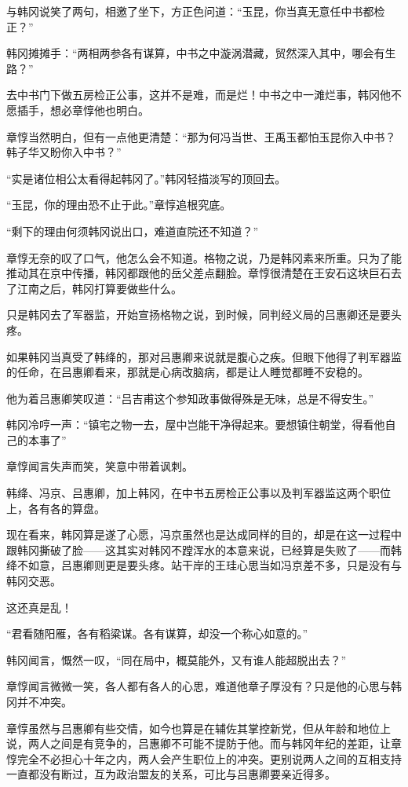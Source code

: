 与韩冈说笑了两句，相邀了坐下，方正色问道：“玉昆，你当真无意任中书都检正？”

韩冈摊摊手：“两相两参各有谋算，中书之中漩涡潜藏，贸然深入其中，哪会有生路？”

去中书门下做五房检正公事，这并不是难，而是烂！中书之中一滩烂事，韩冈他不愿插手，想必章惇他也明白。

章惇当然明白，但有一点他更清楚：“那为何冯当世、王禹玉都怕玉昆你入中书？韩子华又盼你入中书？”

“实是诸位相公太看得起韩冈了。”韩冈轻描淡写的顶回去。

“玉昆，你的理由恐不止于此。”章惇追根究底。

“剩下的理由何须韩冈说出口，难道直院还不知道？”

章惇无奈的叹了口气，他怎么会不知道。格物之说，乃是韩冈素来所重。只为了能推动其在京中传播，韩冈都跟他的岳父差点翻脸。章惇很清楚在王安石这块巨石去了江南之后，韩冈打算要做些什么。

只是韩冈去了军器监，开始宣扬格物之说，到时候，同判经义局的吕惠卿还是要头疼。

如果韩冈当真受了韩绛的，那对吕惠卿来说就是腹心之疾。但眼下他得了判军器监的任命，在吕惠卿看来，那就是心病改脑病，都是让人睡觉都睡不安稳的。

他为着吕惠卿笑叹道：“吕吉甫这个参知政事做得殊是无味，总是不得安生。”

韩冈冷哼一声：“镇宅之物一去，屋中岂能干净得起来。要想镇住朝堂，得看他自己的本事了”

章惇闻言失声而笑，笑意中带着讽刺。

韩绛、冯京、吕惠卿，加上韩冈，在中书五房检正公事以及判军器监这两个职位上，各有各的算盘。

现在看来，韩冈算是遂了心愿，冯京虽然也是达成同样的目的，却是在这一过程中跟韩冈撕破了脸——这其实对韩冈不蹚浑水的本意来说，已经算是失败了——而韩绛不如意，吕惠卿则更是要头疼。站干岸的王珪心思当如冯京差不多，只是没有与韩冈交恶。

这还真是乱！

“君看随阳雁，各有稻粱谋。各有谋算，却没一个称心如意的。”

韩冈闻言，慨然一叹，“同在局中，概莫能外，又有谁人能超脱出去？”

章惇闻言微微一笑，各人都有各人的心思，难道他章子厚没有？只是他的心思与韩冈并不冲突。

章惇虽然与吕惠卿有些交情，如今也算是在辅佐其掌控新党，但从年龄和地位上说，两人之间是有竞争的，吕惠卿不可能不提防于他。而与韩冈年纪的差距，让章惇完全不必担心十年之内，两人会产生职位上的冲突。更别说两人之间的互相支持一直都没有断过，互为政治盟友的关系，可比与吕惠卿要亲近得多。

